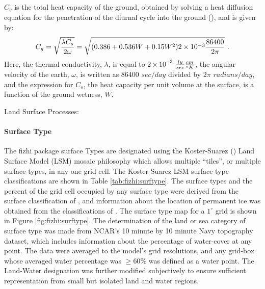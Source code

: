 $C_g$ is the total heat capacity of the ground, obtained by solving a heat diffusion equation
for the penetration of the diurnal cycle into the ground (\cite{black:77}), and is given by:
\[
C_g = \sqrt{ {\lambda C_s \over 2\omega} } = \sqrt{(0.386 + 0.536W + 0.15W^2)2\times10^{-3}
{86400 \over 2 \pi} } \, \, .
\]
Here, the thermal conductivity, $\lambda$, is equal to $2\times10^{-3}$ ${ly\over{ sec}}
{cm \over {^oK}}$,    
the angular velocity of the earth, $\omega$, is written as $86400$ $sec/day$ divided
by $2 \pi$ $radians/  
day$, and the expression for $C_s$, the heat capacity per unit volume at the surface,
is a function of the ground wetness, $W$.

Land Surface Processes:

\paragraph{Surface Type}
The fizhi package surface Types are designated using the Koster-Suarez (\cite{ks:91,ks:92}) 
Land Surface Model (LSM) mosaic philosophy which allows multiple ``tiles'', or multiple surface 
types, in any one grid cell. The Koster-Suarez LSM surface type classifications
are shown in Table \ref{tab:fizhi:surftype}. The surface types and the percent of the grid
cell occupied by any surface type were derived from the surface classification of
\cite{deftow:94}, and information about the location of permanent
ice was obtained from the classifications of \cite{dorsell:89}.
The surface type map for a $1^\circ$ grid is shown in Figure \ref{fig:fizhi:surftype}.
The determination of the land or sea category of surface type was made from NCAR's
10 minute by 10 minute Navy topography 
dataset, which includes information about the percentage of water-cover at any point.
The data were averaged to the model's grid resolutions,
and any grid-box whose averaged water percentage was $\geq 60 \%$ was
defined as a water point. The Land-Water designation was further modified
subjectively to ensure sufficient representation from small but isolated land and water regions.
 

